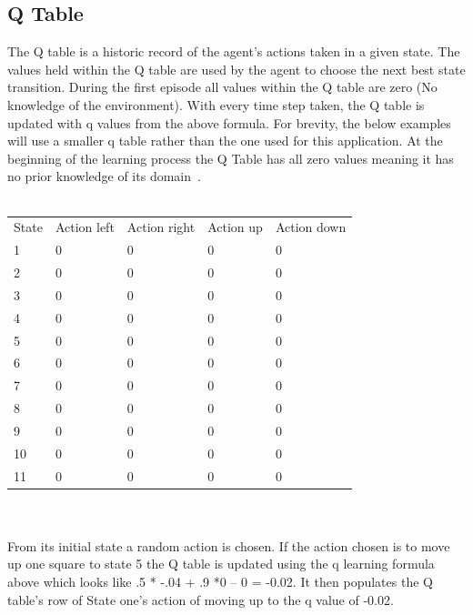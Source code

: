 \subsection{Q Table}
The Q table is a historic record of the agent’s actions taken in a given state. The values held within the Q table are used by the agent to choose the next best state transition. During the first episode all values within the Q table are zero (No knowledge of the environment). With every time step taken, the Q table is updated with q values from the above formula. For brevity, the below examples will use a smaller q table rather than the one used for this application.
At the beginning of the learning process the Q Table has all zero values meaning it has no prior knowledge of its domain~\cite{Lanzi2002}.
\\
\\
\begin{tabular}{lllll}
State & Action left & Action right & Action up & Action down \\
1     & 0           & 0            & 0         & 0           \\
2     & 0           & 0            & 0         & 0           \\
3     & 0           & 0            & 0         & 0           \\
4     & 0           & 0            & 0         & 0           \\
5     & 0           & 0            & 0         & 0           \\
6     & 0           & 0            & 0         & 0           \\
7     & 0           & 0            & 0         & 0           \\
8     & 0           & 0            & 0         & 0           \\
9     & 0           & 0            & 0         & 0           \\
10    & 0           & 0            & 0         & 0           \\
11    & 0           & 0            & 0         & 0          
\end{tabular}
\\
\\
From its initial state a random action is chosen. If the action chosen is to move up one square to state 5 the Q table is updated using the q learning formula above which looks like   .5 * -.04  + .9 *0 – 0 = -0.02.
It then populates the Q table's row of State one's action of moving up to the q value of -0.02.

